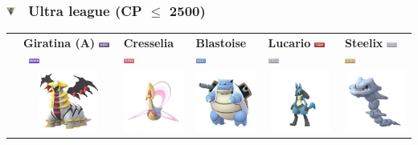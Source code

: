 \documentclass[8pt,aspectratio=169,compress]{beamer}
\newcommand{\fightingfull}{\includegraphics[height=0.15cm]{../../images/type/full/Fighting.png}}
\newcommand{\ghostfull}{\includegraphics[height=0.15cm]{../../images/type/full/Ghost.png}}
\newcommand{\dragonfull}{\includegraphics[height=0.15cm]{../../images/type/full/Dragon.png}}
\newcommand{\groundfull}{\includegraphics[height=0.15cm]{../../images/type/full/Ground.png}}
\newcommand{\psychicfull}{\includegraphics[height=0.15cm]{../../images/type/full/Psychic.png}}
\newcommand{\waterfull}{\includegraphics[height=0.15cm]{../../images/type/full/Water.png}}
\newcommand{\steelfull}{\includegraphics[height=0.15cm]{../../images/type/full/Steel.png}}
\begin{document}
\begin{frame}
\frametitle{\includegraphics[width=0.3cm]{../../pve/guide/ultra_league.png} ~Ultra league (CP $\leq$ 2500)}

\begin{tiny}
\begin{block}{}
\begin{center}

\begin{tabular}{rp{2cm}p{2cm}p{2cm}p{2cm}p{2cm}} 
  & \textbf{Giratina (A)} \hfill \ghostfull~\dragonfull& \textbf{Cresselia} \hfill \psychicfull & \textbf{Blastoise} \hfill\waterfull &\textbf{Lucario} \hfill\fightingfull~\steelfull & \textbf{Steelix} \hfill \steelfull~\groundfull \\ 
  & \multicolumn{1}{c}{\includegraphics[width=2cm]{../../images/pokemon/giratina_a}} &  \multicolumn{1}{c}{\includegraphics[width=2cm]{../../images/pokemon/cresselia} } & \multicolumn{1}{c}{\includegraphics[width=2cm]{../../images/pokemon/blastoise} } & \multicolumn{1}{c}{\includegraphics[width=2cm]{../../images/pokemon/lucario} } & \multicolumn{1}{c}{\includegraphics[width=2cm]{../../images/pokemon/steelix} }  \\ \hline 

\end{tabular}
\end{center}
\end{block}
\end{tiny}
\end{frame}
\end{document}
